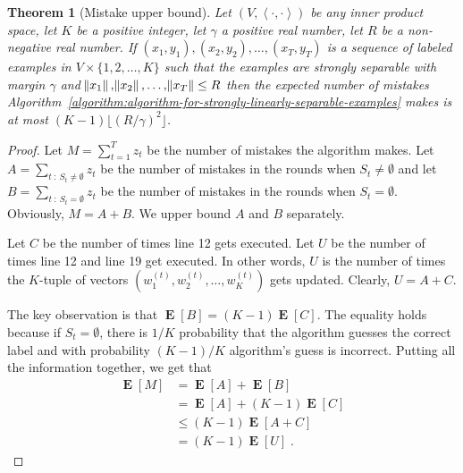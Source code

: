 \documentclass[12pt]{article}
\newtheorem{theorem}[definition]{Theorem}
\newcommand{\ip}[2]{\left\langle #1, #2 \right\rangle} %
\DeclareMathOperator*{\Exp}{\mathbf{E}}  %
\begin{document}
\begin{theorem}[Mistake upper bound]
\label{theorem:strongly-separable-example-mistake-upper-bound}
Let $(V, \ip{\cdot}{\cdot})$ be any inner product space, let $K$ be a positive
integer, let $\gamma$ a positive real number, let $R$ be a non-negative real number. If
$(x_1, y_1), (x_2, y_2), \dots, (x_T, y_T)$ is a sequence of labeled examples in
$V \times \{1,2,\dots,K\}$ such that the examples are strongly separable with
margin $\gamma$ and $\norm{x_1}, \norm{x_2}, \dots, \norm{x_T} \le R$ then the
expected number of mistakes
Algorithm~\ref{algorithm:algorithm-for-strongly-linearly-separable-examples}
makes is at most $(K-1) \lfloor (R/\gamma)^2 \rfloor$.
\end{theorem}

\begin{proof}
Let $M = \sum_{t=1}^T z_t$ be the number of mistakes the algorithm makes. Let $A
= \sum_{t ~:~ S_t \neq \emptyset} z_t$ be the number of mistakes in the rounds
when $S_t \neq \emptyset$ and let $B = \sum_{t ~:~ S_t = \emptyset} z_t$ be the
number of mistakes in the rounds when $S_t = \emptyset$. Obviously, $M = A + B$.
We upper bound $A$ and $B$ separately.

Let $C$ be the number of times line 12 gets executed. Let $U$ be the number of
times line 12 and line 19 get executed. In other words, $U$ is the number of
times the $K$-tuple of vectors $(w_1^{(t)}, w_2^{(t)}, \dots, w_K^{(t)})$ gets
updated. Clearly, $U = A + C$.

The key observation is that $\Exp[B] = (K-1) \Exp[C]$. The equality holds
because if $S_t = \emptyset$, there is $1/K$ probability that the algorithm
guesses the correct label and with probability $(K-1)/K$ algorithm's guess is
incorrect. Putting all the information together, we get that
\begin{align*}
\Exp[M]
& = \Exp[A] + \Exp[B] \\
& = \Exp[A] + (K-1) \Exp[C]  \\
& \le (K-1) \Exp[A + C] \\
& = (K-1) \Exp[U]  \; .
\end{align*}


\end{proof}
\end{document}
